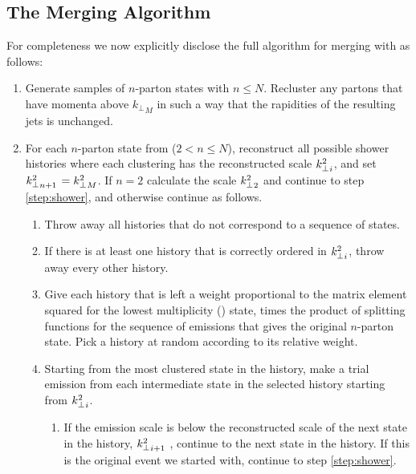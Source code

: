 \subsection{The Merging Algorithm}
\label{sec:ModifiedMergingAlgo}
For completeness we now explicitly disclose the full algorithm for merging \HEJ with \pyt as follows:
\begin{enumerate}
\item Generate samples of $n$-parton \HEJ states with $n \leq N$. Recluster any partons that have momenta above ${k_\perp}_{M}$ in such a way that the rapidities
of the resulting jets is unchanged. 

\item 
  For each $n$-parton state from \HEJ ($2<n\leq N$), reconstruct all possible \pyt
  shower histories where each clustering has the reconstructed scale ${k^2_\perp}_{i}$, and set ${k^2_\perp}_{n+1}$ $ = {k^2_\perp}_{M}$. If $n=2$
  calculate the scale ${k^2_\perp}_{2}$ and continue to step \ref{step:shower}, and otherwise continue as follows.
  \begin{enumerate}

  \item Throw away all histories that do not correspond to a sequence
    of \HEJ states.
  
  \item If there is at least one history that is correctly ordered in
    ${k^2_\perp}_{i}$, throw away every other history.
  
  \item Give each history that is left a weight proportional
    to the \HEJ matrix element squared for the lowest multiplicity (\HEJ) state, times
    the product of \pyt splitting functions for the sequence of emissions 
    that gives the original $n$-parton state. Pick a history at random according to its relative weight.
    
  \item Starting from the most clustered state in the history, 
    make a trial emission from each intermediate state in the selected history
    starting from ${k^2_\perp}_{i}$.

    \begin{enumerate}
     \item \label{step:trialemission} If the emission scale is below the reconstructed scale of the next state in the history, ${k^2_\perp}_{i+1}$ ,
     continue to the next state in the history. If this is the original event we started with, 
     continue to step \ref{step:shower}.
     

\end{enumerate}
\end{enumerate}
\end{enumerate}
